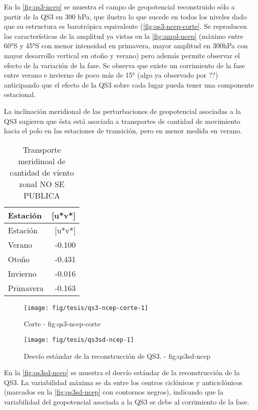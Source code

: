 \documentclass[spanish,a4paper]{book}
\begin{document}
En la \autoref{fig:qs3-ncep} se muestra el campo de geopotencial
reconstruido sólo a partir de la QS3 en 300 hPa, que ilustra lo que
sucede en todos los niveles dado que su estructura es barotrópica
equivalente (\autoref{fig:qs3-ncep-corte}. Se reproducen las
características de la amplitud ya vistas en la \autoref{fig:ampl-ncep}
(máximo entre 60°S y 45°S con menor intensidad en primavera, mayor
amplitud en 300hPa con mayor desarrollo vertical en otoño y verano) pero
además permite observar el efecto de la variación de la fase. Se observa
que existe un corrimiento de la fase entre verano e invierno de poco más
de 15° (algo ya observado por
??)
anticipando que el efecto de la QS3 sobre cada lugar 
pueda tener una componente estacional.

La inclinación meridional de las perturbaciones de geopotencial
asociadas a la QS3 sugieren que ésta está asociada a transportes de
cantidad de movimiento hacia el polo en las estaciones de transición,
pero en menor medida en verano.

\begin{longtable}[]{@{}lr@{}}
\caption{Transporte meridinoal de cantidad de viento zonal NO SE
PUBLICA}\tabularnewline
\toprule
Estación & {[}u*v*{]}\tabularnewline
\midrule
\endfirsthead
\toprule
Estación & {[}u*v*{]}\tabularnewline
\midrule
\endhead
Verano & -0.100\tabularnewline
Otoño & -0.431\tabularnewline
Invierno & -0.016\tabularnewline
Primavera & -0.163\tabularnewline
\bottomrule
\end{longtable}

\begin{figure*}
\texttt{[image: fig/tesis/qs3-ncep-corte-1]} \caption{Corte - fig:qs3-ncep-corte}\label{fig:qs3-ncep-corte}
\end{figure*}

\begin{figure*}
\texttt{[image: fig/tesis/qs3sd-ncep-1]} \caption{Desvío estándar de la reconstrucción de QS3. - fig:qs3sd-ncep}\label{fig:qs3sd-ncep}
\end{figure*}

En la \autoref{fig:qs3sd-ncep} se muestra el desvío estándar de la
reconstrucción de la QS3. La variabilidad máxima se da entre los centros
ciclónicos y anticiclónicos (marcados en la \autoref{fig:qs3sd-ncep} con
contornos negros), indicando que la variabilidad del geopotencial
asociada a la QS3 se debe al corrimiento de la fase.
\end{document}
